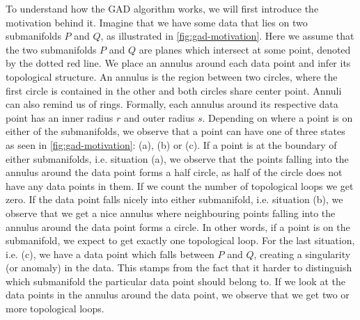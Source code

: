To understand how the GAD algorithm works, we will first introduce the motivation behind it. Imagine that we have some data that lies on two submanifolds $P$ and $Q$, as illustrated in \cref{fig:gad-motivation}. Here we assume that the two submanifolds $P$ and $Q$ are planes which intersect at some point, denoted by the dotted red line. We place an annulus around each data point and infer its topological structure. An annulus is the region between two circles, where the first circle is contained in the other and both circles share center point. Annuli can also remind us of rings. Formally, each annulus around its respective data point has an inner radius $r$ and outer radius $s$. Depending on where a point is on either of the submanifolds, we observe that a point can have one of three states as seen in \cref{fig:gad-motivation}: (a), (b) or (c). If a point is at the boundary of either submanifolds, i.e. situation (a), we observe that the points falling into the annulus around the data point forms a half circle, as half of the circle does not have any data points in them. If we count the number of topological loops we get zero. If the data point falls nicely into either submanifold, i.e. situation (b), we observe that we get a nice annulus where neighbouring points falling into the annulus around the data point forms a circle. In other words, if a point is on the submanifold, we expect to get exactly one topological loop. For the last situation, i.e. (c), we have a data point which falls between $P$ and $Q$, creating a singularity (or anomaly) in the data. This stamps from the fact that it harder to distinguish which submanifold the particular data point should belong to. If we look at the data points in the annulus around the data point, we observe that we get two or more topological loops.
